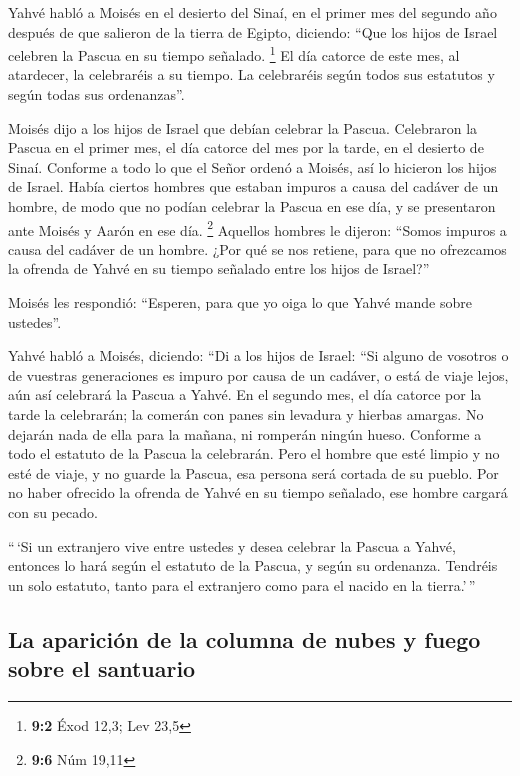 \begin{paracol}{2}
 Yahvé habló a Moisés en el desierto del Sinaí, en el
primer mes del segundo año después de que salieron de la tierra de
Egipto, diciendo:  ``Que los hijos de Israel celebren la
Pascua en su tiempo señalado. \footnote{\textbf{9:2} Éxod 12,3; Lev 23,5}
 El día catorce de este mes, al atardecer, la celebraréis
a su tiempo. La celebraréis según todos sus estatutos y según todas sus
ordenanzas''.

 Moisés dijo a los hijos de Israel que debían celebrar la
Pascua.  Celebraron la Pascua en el primer mes, el día
catorce del mes por la tarde, en el desierto de Sinaí. Conforme a todo
lo que el Señor ordenó a Moisés, así lo hicieron los hijos de Israel.
 Había ciertos hombres que estaban impuros a causa del
cadáver de un hombre, de modo que no podían celebrar la Pascua en ese
día, y se presentaron ante Moisés y Aarón en ese día. \footnote{\textbf{9:6}
  Núm 19,11}  Aquellos hombres le dijeron: ``Somos impuros
a causa del cadáver de un hombre. ¿Por qué se nos retiene, para que no
ofrezcamos la ofrenda de Yahvé en su tiempo señalado entre los hijos de
Israel?''

 Moisés les respondió: ``Esperen, para que yo oiga lo que
Yahvé mande sobre ustedes''.

 Yahvé habló a Moisés, diciendo:  ``Di a
los hijos de Israel: ``Si alguno de vosotros o de vuestras generaciones
es impuro por causa de un cadáver, o está de viaje lejos, aún así
celebrará la Pascua a Yahvé.  En el segundo mes, el día
catorce por la tarde la celebrarán; la comerán con panes sin levadura y
hierbas amargas.  No dejarán nada de ella para la mañana,
ni romperán ningún hueso. Conforme a todo el estatuto de la Pascua la
celebrarán.  Pero el hombre que esté limpio y no esté de
viaje, y no guarde la Pascua, esa persona será cortada de su pueblo. Por
no haber ofrecido la ofrenda de Yahvé en su tiempo señalado, ese hombre
cargará con su pecado.

 ``\,`Si un extranjero vive entre ustedes y desea
celebrar la Pascua a Yahvé, entonces lo hará según el estatuto de la
Pascua, y según su ordenanza. Tendréis un solo estatuto, tanto para el
extranjero como para el nacido en la tierra.'\,''

\hypertarget{la-apariciuxf3n-de-la-columna-de-nubes-y-fuego-sobre-el-santuario}{%
\subsection{La aparición de la columna de nubes y fuego sobre el
santuario}\label{la-apariciuxf3n-de-la-columna-de-nubes-y-fuego-sobre-el-santuario}}


\end{paracol}

